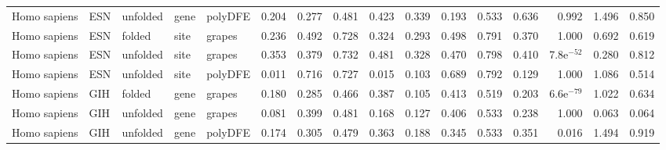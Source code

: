 \begin{longtable}{lllllrrrrrrrrrrr}
        Homo sapiens &                       ESN &  unfolded &  gene &  polyDFE &                              0.204 &                               0.277 &                 0.481 &                 0.423 &                              0.339 &                               0.193 &                 0.533 &                 0.636 &         0.992 &  1.496 &  0.850 \\
        Homo sapiens &                       ESN &    folded &  site &   grapes &                              0.236 &                               0.492 &                 0.728 &                 0.324 &                              0.293 &                               0.498 &                 0.791 &                 0.370 &         1.000 &  0.692 &  0.619 \\
        Homo sapiens &                       ESN &  unfolded &  site &   grapes &                              0.353 &                               0.379 &                 0.732 &                 0.481 &                              0.328 &                               0.470 &                 0.798 &                 0.410 &  7.8e$^{-52}$ &  0.280 &  0.812 \\
        Homo sapiens &                       ESN &  unfolded &  site &  polyDFE &                              0.011 &                               0.716 &                 0.727 &                 0.015 &                              0.103 &                               0.689 &                 0.792 &                 0.129 &         1.000 &  1.086 &  0.514 \\
        Homo sapiens &                       GIH &    folded &  gene &   grapes &                              0.180 &                               0.285 &                 0.466 &                 0.387 &                              0.105 &                               0.413 &                 0.519 &                 0.203 &  6.6e$^{-79}$ &  1.022 &  0.634 \\
        Homo sapiens &                       GIH &  unfolded &  gene &   grapes &                              0.081 &                               0.399 &                 0.481 &                 0.168 &                              0.127 &                               0.406 &                 0.533 &                 0.238 &         1.000 &  0.063 &  0.064 \\
        Homo sapiens &                       GIH &  unfolded &  gene &  polyDFE &                              0.174 &                               0.305 &                 0.479 &                 0.363 &                              0.188 &                               0.345 &                 0.533 &                 0.351 &         0.016 &  1.494 &  0.919 \\

\end{longtable}
